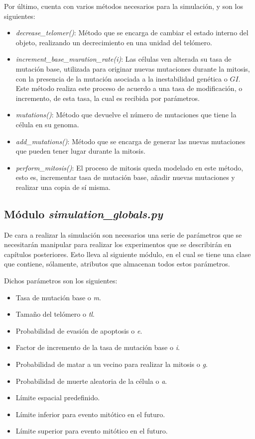 Por último, cuenta con varios métodos necesarios para la simulación, y son los siguientes:

\begin{itemize}
    \item \textit{decrease\_telomer()}: Método que se encarga de cambiar el estado interno del objeto, realizando un decrecimiento en una unidad del telómero.
    \item \textit{increment\_base\_muration\_rate(i)}: Las células ven alterada su tasa de mutación base, utilizada para originar nuevas mutaciones durante la mitosis,
    con la presencia de la mutación asociada a la inestabilidad genética o $GI$. Este método realiza este proceso de acuerdo a una tasa de modificación, o incremento,
    de esta tasa, la cual es recibida por parámetros.
    \item \textit{mutations()}: Método que devuelve el número de mutaciones que tiene la célula en su genoma.
    \item \textit{add\_mutations()}: Método que se encarga de generar las nuevas mutaciones que pueden tener lugar durante la mitosis.
    \item \textit{perform\_mitosis()}: El proceso de mitosis queda modelado en este método, esto es, incrementar tasa de mutación base, añadir nuevas mutaciones y
    realizar una copia de sí misma.
\end{itemize}

\subsection{Módulo \textit{simulation\_globals.py}}

De cara a realizar la simulación son necesarios una serie de parámetros que se necesitarán manipular
para realizar los experimentos que se describirán en capítulos posteriores. Esto lleva al siguiente módulo,
en el cual se tiene una clase que contiene, sólamente, atributos que almacenan todos estos parámetros.

Dichos parámetros son los siguientes:

\begin{itemize}
    \item Tasa de mutación base o \textit{m}.
    \item Tamaño del telómero o \textit{tl}.
    \item Probabilidad de evasión de apoptosis o \textit{e}.
    \item Factor de incremento de la tasa de mutación base o \textit{i}.
    \item Probabilidad de matar a un vecino para realizar la mitosis o \textit{g}.
    \item Probabilidad de muerte aleatoria de la célula o \textit{a}.
    \item Límite espacial predefinido.
    \item Límite inferior para evento mitótico en el futuro.
    \item Límite superior para evento mitótico en el futuro.
\end{itemize}

